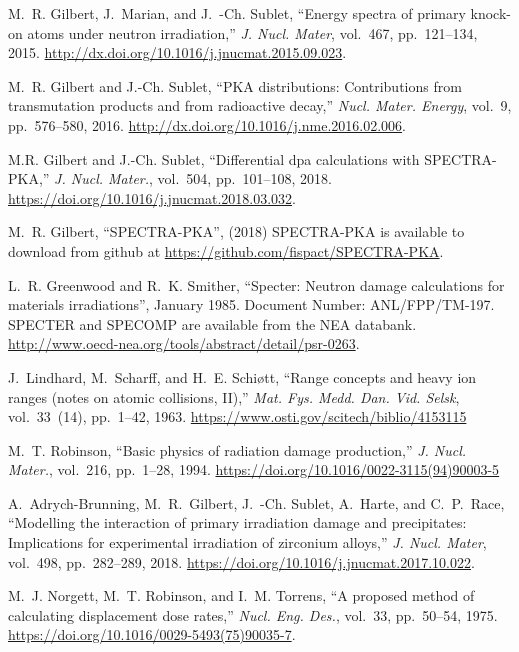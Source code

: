 \documentclass[a4paper]{article}
\begin{document}
\begin{thebibliography}{10}

M.~R. Gilbert, J.~Marian, and J.~{\relax -Ch}. Sublet, ``Energy spectra of
  primary knock-on atoms under neutron irradiation,'' {\em J. Nucl. Mater},
  vol.~467, pp.~121--134, 2015.
\newblock \url{http://dx.doi.org/10.1016/j.jnucmat.2015.09.023}.

M.~R. Gilbert and J.-{\relax Ch}. Sublet, ``{{PKA distributions: Contributions
  from transmutation products and from radioactive decay}},'' {\em Nucl. Mater.
  Energy}, vol.~9, pp.~576--580, 2016.
    \newblock \url{http://dx.doi.org/10.1016/j.nme.2016.02.006}.






M.R. Gilbert and J.-Ch. Sublet, ``{{Differential dpa calculations with
  SPECTRA-PKA}},'' {\em J. Nucl. Mater.}, vol.~504, pp.~101--108, 2018.
    \newblock \url{https://doi.org/10.1016/j.jnucmat.2018.03.032}.

M.~R. Gilbert, ``{SPECTRA-PKA}'',  (2018) {SPECTRA-PKA is available to download
  from github at \url{https://github.com/fispact/SPECTRA-PKA}}.

L.~R. Greenwood and R.~K. Smither,
  ``Specter: Neutron damage calculations for materials
  irradiations'', January 1985. Document Number:
  ANL/FPP/TM-197. SPECTER and SPECOMP are available from the NEA databank.
\newblock \url{http://www.oecd-nea.org/tools/abstract/detail/psr-0263}.



J.~Lindhard, M.~Scharff, and H.~E. Schi{\o}tt,
  ``{{Range concepts and heavy
  ion ranges (notes on atomic collisions, {II})}},'' {\em Mat. Fys. Medd. Dan. Vid.
  Selsk}, vol.~33~(14), pp.~1--42, 1963.
\newblock\url{https://www.osti.gov/scitech/biblio/4153115}

M.~T. Robinson, ``{{Basic physics of radiation damage production}},'' {\em J. Nucl. Mater.}, vol.~216, pp.~1--28, 1994.
\newblock
  \url{https://doi.org/10.1016/0022-3115(94)90003-5}


A.~Adrych-Brunning, M.~R.~Gilbert, J.~{\relax -Ch}. Sublet, A.~Harte, and C.~P.~Race, ``Modelling the interaction of primary irradiation damage and
precipitates: Implications for experimental irradiation of zirconium
alloys,'' {\em J. Nucl. Mater},
  vol.~498, pp.~282--289, 2018.
\newblock \url{https://doi.org/10.1016/j.jnucmat.2017.10.022}.

M.~J. Norgett, M.~T. Robinson, and I.~M. Torrens, ``{{A proposed method of calculating
  displacement dose rates}},'' {\em Nucl. Eng. Des.}, vol.~33, pp.~50--54, 1975.
\newblock \url{https://doi.org/10.1016/0029-5493(75)90035-7}.







\end{thebibliography}
\end{document}
